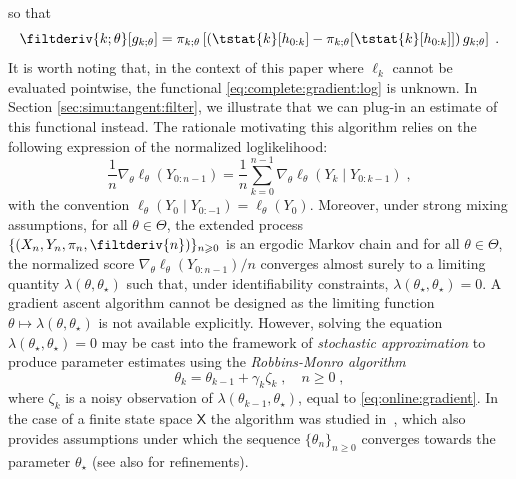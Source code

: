 \documentclass[12pt]{article}
\newcommand{\md}[1]{g_{#1}}
\newcommand{\logllh}[1]{\ell_{#1}}
\newcommand{\pred}[1]{\pi_{#1}}
\newcommand{\parvec}{\theta}
\newcommand{\parspace}{\Theta}
\newcommand{\af}[1]{h_{#1}}
\newcommand{\deriv}{\nabla_{\parvec}}
\newcommand{\set}[1]{\mathsf{#1}}
\newcommand{\eqsp}{\;}
\newcommand{\qg}[1]{\ell_{#1}}
\begin{document}
so that
\begin{equation} 
\label{eq:tangent:identity}
\filtderiv{k;\parvec}[\md{k;\parvec}] = \pred{k;\parvec}\left[\left(\tstat{k} [\af{0:k}] - \pred{k;\parvec}[\tstat{k}[\af{0:k}]]\right) \md{k;\parvec}\right]\eqsp.
\end{equation}
It is worth noting that, in the context of this paper where $\qg{k}$ cannot be evaluated pointwise,  the functional \eqref{eq:complete:gradient:log} is unknown.  In Section \ref{sec:simu:tangent:filter}, we illustrate that we can plug-in an estimate of this functional instead. The rationale motivating this algorithm relies on the following expression of the normalized loglikelihood:
$$
\frac{1}{n} \deriv \logllh{\parvec}(Y_{0:n-1}) = \frac{1}{n} \sum_{k = 0}^{n-1} \deriv \logllh{\parvec}\left(Y_k \mid Y_{0:k - 1}\right)\eqsp,$$
with the convention $ \logllh{\parvec}(Y_0 \mid Y_{0:-1}) = \logllh{\parvec}(Y_0)$. Moreover, under strong mixing assumptions, for all  $\parvec \in \parspace$, the extended process $\{ (X_n, Y_n, \pred{n}, \filtderiv{n}) \}_{n \geqslant 0}$ is an ergodic Markov chain and for all $\parvec \in \parspace$, the normalized score $\deriv \logllh{\parvec}(Y_{0:n-1})/n$  converges almost surely to a limiting quantity $\lambda(\parvec, \parvec_{\star})$ such that, under identifiability constraints, $\lambda(\parvec_{\star}, \parvec_{\star}) = 0$. 
A gradient ascent algorithm cannot be designed as the limiting function $\parvec \mapsto \lambda(\parvec, \parvec_{\star})$ is not available explicitly. 
However, solving the equation $\lambda(\parvec_{\star}, \parvec_{\star}) = 0$ may be cast into the framework of \emph{stochastic approximation} to produce parameter estimates using the \emph{Robbins-Monro algorithm}
\begin{equation}
\label{eq:par:update}
\parvec_{k} = \parvec_{k - 1} + \gamma_{k} \zeta_{k}\eqsp, \quad n\geqslant 0\eqsp, 
\end{equation}
where $\zeta_{k}$ is a noisy observation of $\lambda(\parvec_{k - 1}, \parvec_{\star})$, equal to \eqref{eq:online:gradient}.  
In the case of a finite state space $\set{X}$ the algorithm was studied in~\cite{legland1997recursive}, which also provides assumptions under which the sequence $\{\parvec_{n}\}_{n\geqslant 0}$ converges towards the parameter $\parvec_{\star}$ (see also \cite{tadic2010analyticity} for refinements). 
\end{document}
